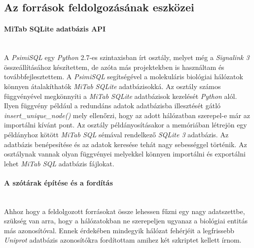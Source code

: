 \documentclass[a4paper,12pt]{article}
\begin{document}
		
		\subsection{Az források feldolgozásának eszközei}
		
			\paragraph{MiTab SQLite adatbázis API} \mbox{}\\
			A \textit{PsimiSQL} egy \textit{Python} 2.7-es szintaxisban írt osztály, melyet még a \textit{Signalink 3} összeállításához készítettem, de azóta más projektekben is használtam és továbbfejlesztettem. A \textit{PsimiSQL} segítségével a molekuláris biológiai hálózatok könnyen átalakíthatók \textit{MiTab SQLite} adatbázisokká. Az osztály számos függvényével megkönnyíti a \textit{MiTab SQLite} adatbázisok kezelését \textit{Python} alól. Ilyen függvény például a redundáns adatok adatbázisba illesztését gátló \textit{insert\_unique\_node()} mely ellenőrzi, hogy az adott hálózatban szerepel-e már az importálni kívánt pont. Az osztály példányosításakor a memóriában létrejön egy példányhoz kötött \textit{MiTab SQL} sémával rendelkező \textit{SQLite 3} adatbázis. Az adatbázis benépesítése és az adatok keresése tehát nagy sebességgel történik. Az osztálynak vannak olyan függvényei melyekkel könnyen importálni és exportálni lehet \textit{MiTab SQL} adatbázis fájlokat.
			
			\paragraph{A szótárak építése és a fordítás} \mbox{}\\
			Ahhoz hogy a feldolgozott forrásokat össze lehessen fűzni egy nagy adatszettbe, szükség van arra, hogy a hálózatokban ne szerepeljen ugyanaz a biológiai entitás más azonosítóval. Ennek érdekében mindegyik hálózat fehérjéit a legfrissebb \textit{Uniprot} adatbázis azonosítókra fordítottam amihez két szkriptet kellett írnom. 
			
\end{document}

